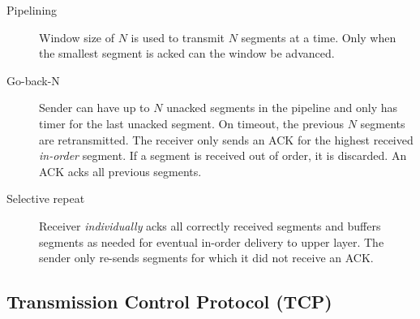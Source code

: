 \documentclass{article}
\begin{document}
\begin{description}
    \item[Pipelining] Window size of $N$ is used to transmit $N$ segments at a time. Only when the
    smallest segment is acked can the window be advanced.
    
    \item[Go-back-N] Sender can have up to $N$ unacked segments in the pipeline and only has timer for
    the last unacked segment. On timeout, the previous $N$ segments are retransmitted. The receiver
    only sends an ACK for the highest received \textit{in-order} segment. If a segment is received
    out of order, it is discarded. An ACK acks all previous segments.
    
    \item[Selective repeat] Receiver \textit{individually} acks all correctly received segments and
    buffers segments as needed for eventual in-order delivery to upper layer. The sender only re-sends
    segments for which it did not receive an ACK.
\end{description}

\subsection*{Transmission Control Protocol (TCP)}
\end{document}
